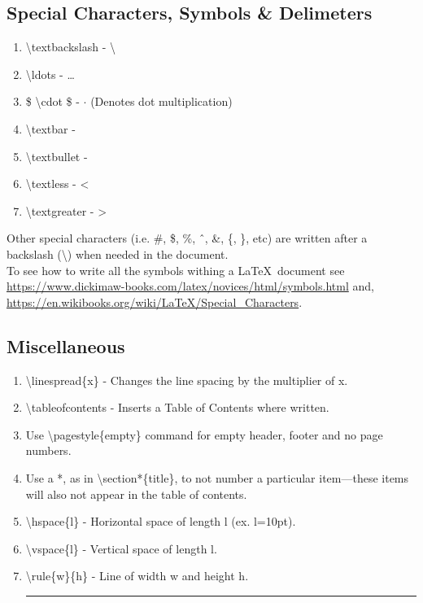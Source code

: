 \documentclass[12pt, twocolumn]{article}
\begin{document}
\subsection{Special Characters, Symbols \& Delimeters}
 \begin{enumerate}
  \item \textbackslash textbackslash - \textbackslash
  \item \textbackslash ldots - \ldots
  \item \$ \textbackslash cdot \$ - $ \cdot $ (Denotes dot multiplication)
  \item \textbackslash textbar - \textbar
  \item \textbackslash textbullet - \textbullet
  \item \textbackslash textless - \textless
  \item \textbackslash textgreater - \textgreater
 \end{enumerate}

 
Other special characters (i.e. \#, \$, \%, \^\ , \&, \{, \}, etc) are written after a backslash (\textbackslash) when needed in the document. \\

\noindent To see how to write all the symbols withing a \LaTeX\ document see \url{https://www.dickimaw-books.com/latex/novices/html/symbols.html} and, \url{https://en.wikibooks.org/wiki/LaTeX/Special_Characters}.
 
 \subsection*{Miscellaneous}
 \begin{enumerate}
  \item \textbackslash linespread\{x\} - Changes the line spacing by the multiplier of x.
  \item \textbackslash tableofcontents - Inserts a Table of Contents where written.
  \item Use \textbackslash pagestyle\{empty\} command for empty header, footer and no page numbers.
  \item Use a *, as in \textbackslash section*\{title\}, to not number a particular item---these items will also not appear in the table of contents.
  \item \textbackslash hspace\{l\} - Horizontal space \hspace{10pt} of length l (ex. l=10pt).
  \item \textbackslash vspace\{l\} - Vertical space of length l. \vspace{10pt}
  \item \textbackslash rule\{w\}\{h\} - Line of width w and height h. \rule{3pt}{10pt}
\end{enumerate}
\end{document}
